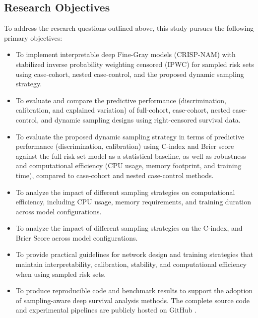 \documentclass[a4paper,twoside,12pt]{report}
\begin{document}
\subsection{Research Objectives}
To address the research questions outlined above, this study pursues the following primary objectives:
\begin{itemize}
    \item To implement interpretable deep Fine-Gray models (CRISP-NAM) with stabilized inverse probability weighting censored (IPWC) for sampled risk sets using case-cohort, nested case-control, and the proposed dynamic sampling strategy.
    \item To evaluate and compare the predictive performance (discrimination, calibration, and explained variation) of full-cohort, case-cohort, nested case-control, and dynamic sampling designs using right-censored survival data.
    \item To evaluate the proposed dynamic sampling strategy in terms of predictive performance (discrimination, calibration) using C-index and Brier score against the full risk-set model as a statistical baseline, as well as robustness and computational efficiency (CPU usage, memory footprint, and training time), compared to case-cohort and nested case-control methods.
    \item To analyze the impact of different sampling strategies on computational efficiency, including CPU usage, memory requirements, and training duration across model configurations.
    \item To analyze the impact of different sampling strategies on the C-index, and Brier Score across model configurations.
    \item To provide practical guidelines for network design and training strategies that maintain interpretability, calibration, stability, and computational efficiency when using sampled risk sets.
    \item To produce reproducible code and benchmark results to support the adoption of sampling-aware deep survival analysis methods. The complete source code and experimental pipelines are publicly hosted on GitHub \citep{falk2026crispnam}.
\end{itemize}
\end{document}

